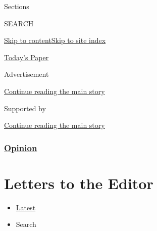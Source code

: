 Sections

SEARCH

\protect\hyperlink{site-content}{Skip to
content}\protect\hyperlink{site-index}{Skip to site index}

\href{https://myaccount.nytimes3xbfgragh.onion/auth/login?response_type=cookie\&client_id=vi}{}

\href{https://www.nytimes3xbfgragh.onion/section/todayspaper}{Today's
Paper}

Advertisement

\protect\hyperlink{after-top}{Continue reading the main story}

Supported by

\protect\hyperlink{after-sponsor}{Continue reading the main story}

\hypertarget{opinion}{%
\subsubsection{\texorpdfstring{\href{/section/opinion}{Opinion}}{Opinion}}\label{opinion}}

\hypertarget{letters-to-the-editor}{%
\section{Letters to the Editor}\label{letters-to-the-editor}}

\begin{itemize}
\tightlist
\item
  \protect\hyperlink{stream-panel}{Latest}
\item
  Search
\end{itemize}

